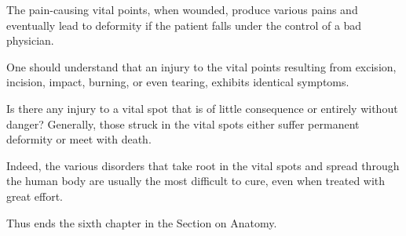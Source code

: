\begin{translation}
\begin{tt}
\item[40]
The pain-causing vital points, when wounded, produce various pains and eventually lead to deformity if the patient falls under the control of a bad physician.

\item[41]
One should understand that an injury to the vital points resulting from excision, incision, impact, burning, or even tearing, exhibits identical symptoms.
\item[42]
Is there any injury to a vital spot that is of little consequence or entirely without danger? Generally, those struck in the vital spots either suffer permanent deformity or meet with death.

\item[43]
Indeed, the various disorders that take root in the vital spots and spread through the human body are usually the most difficult to cure, even when treated with great effort.

Thus ends the sixth chapter in the Section on Anatomy.

\end{tt}
\end{translation}
